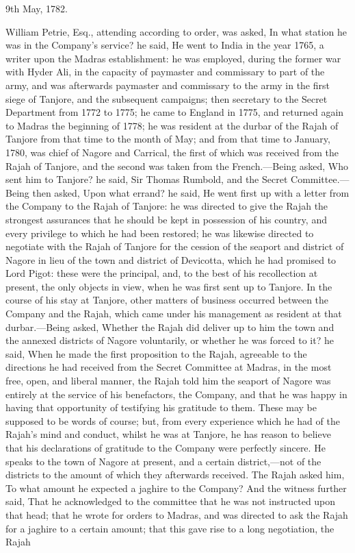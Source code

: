 

\hfill 9th May, 1782.

William Petrie, Esq., attending according to order, was asked, In what station he was in the Company's service? he said, He went to India in the year 1765, a writer upon the Madras establishment: he was employed, during the former war with Hyder Ali, in the capacity of paymaster and commissary to part of the army, and was afterwards paymaster and commissary to the army in the first siege of Tanjore, and the subsequent campaigns; then secretary to the Secret Department from 1772 to 1775; he came to England in 1775, and returned again to Madras the beginning of 1778; he was resident at the durbar of the Rajah of Tanjore from that time to the month of May; and from that time to January, 1780, was chief of Nagore and Carrical, the first of which was received from the Rajah of Tanjore, and the second was taken from the French.—Being asked, Who sent him to Tanjore? he said, Sir Thomas Rumbold, and the Secret Committee.—Being then asked, Upon what errand? he said, He went first up with a letter from the Company to the Rajah of Tanjore: he was directed to give the Rajah the strongest assurances that he should be kept in possession of his country, and every privilege to which he had been restored; he was likewise directed to negotiate with the Rajah of Tanjore for the cession of the seaport and district of Nagore in lieu of the town and district of Devicotta, which he had promised to Lord Pigot: these were the principal, and, to the best of his recollection at present, the only objects in view, when he was first sent up to Tanjore. In the course of his stay at Tanjore, other matters of business occurred between the Company and the Rajah, which came under his management as resident at that durbar.—Being asked, Whether the Rajah did deliver up to him the town and the annexed districts of Nagore voluntarily, or whether he was forced to it? he said, When he made the first proposition to the Rajah, agreeable to the directions he had received from the Secret Committee at Madras, in the most free, open, and liberal manner, the Rajah told him the seaport of Nagore was entirely at the service of his benefactors, the Company, and that he was happy in having that opportunity of testifying his gratitude to them. These may be supposed to be words of course; but, from every experience which he had of the Rajah's mind and conduct, whilst he was at Tanjore, he has reason to believe that his declarations of gratitude to the Company were perfectly sincere. He speaks to the town of Nagore at present, and a certain district,—not of the districts to the amount of which they afterwards received. The Rajah asked him, To what amount he expected a jaghire to the Company? And the witness further said, That he acknowledged to the committee that he was not instructed upon that head; that he wrote for orders to Madras, and was directed to ask the Rajah for a jaghire to a certain amount; that this gave rise to a long negotiation, the Rajah 